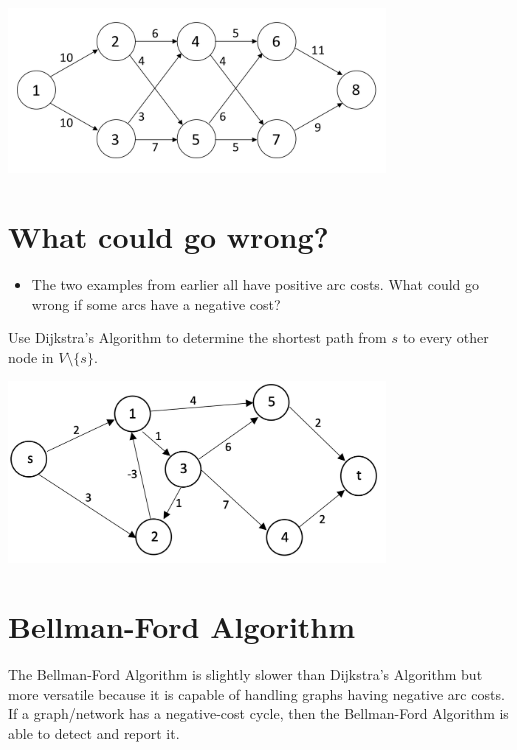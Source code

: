 \documentclass[12pt]{article}
\theoremstyle{definition}
\begin{document}
\begin{center}
\includegraphics[width=10cm]{shortestpathexample2}
\end{center}

\vfill

\newpage

\section{What could go wrong?}

\begin{itemize}

\item The two examples from earlier all have positive arc costs. What could go wrong if some arcs have a negative cost?

\end{itemize}
\vfill
 
Use Dijkstra's Algorithm to determine the shortest path from $s$ to every other node in $V \setminus \{s\}$.

\begin{center}
\includegraphics[width=10cm]{shortestpathnegativecycles}
\end{center}

\vfill


\newpage
\section{Bellman-Ford Algorithm}


The Bellman-Ford Algorithm is slightly slower than Dijkstra's Algorithm but more versatile because it is capable of handling graphs having negative arc costs. If a graph/network has a negative-cost cycle, then the Bellman-Ford Algorithm is able to detect and report it.
\end{document}
